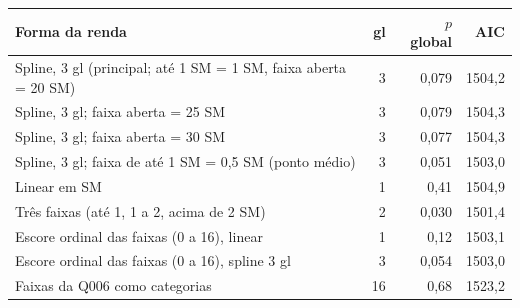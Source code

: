 \begin{tabular}{lrrr}
\toprule
Forma da renda & gl & $p$ global & AIC \\
\midrule
Spline, 3 gl (principal; até 1 SM = 1 SM, faixa aberta = 20 SM) & 3 & 0,079 & 1504,2 \\
Spline, 3 gl; faixa aberta = 25 SM & 3 & 0,079 & 1504,3 \\
Spline, 3 gl; faixa aberta = 30 SM & 3 & 0,077 & 1504,3 \\
Spline, 3 gl; faixa de até 1 SM = 0,5 SM (ponto médio) & 3 & 0,051 & 1503,0 \\
Linear em SM & 1 & 0,41 & 1504,9 \\
Três faixas (até 1, 1 a 2, acima de 2 SM) & 2 & 0,030 & 1501,4 \\
Escore ordinal das faixas (0 a 16), linear & 1 & 0,12 & 1503,1 \\
Escore ordinal das faixas (0 a 16), spline 3 gl & 3 & 0,054 & 1503,0 \\
Faixas da Q006 como categorias & 16 & 0,68 & 1523,2 \\
\bottomrule
\end{tabular}
